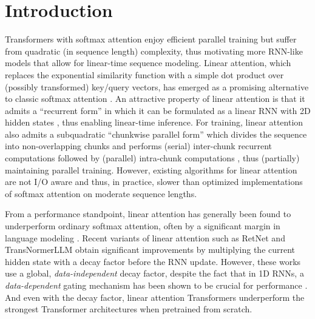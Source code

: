 \vspace{-2mm}
\section{Introduction}
\vspace{-4mm}
\label{sec:intro}
Transformers with softmax attention \citep{vaswani2017attention}  enjoy efficient parallel training but suffer from quadratic (in sequence length) complexity, thus motivating more RNN-like models that allow for linear-time sequence modeling. Linear attention, which replaces the exponential similarity function with a simple dot product over (possibly transformed) key/query vectors, has emerged as a promising alternative to classic softmax attention \citep{katharopoulos2020transformers,performer,kasai-etal-2021-finetuning,peng2021random}. An attractive property of linear attention  is that it admits a  ``recurrent form'' in which it can be formulated as a linear RNN with 2D hidden states \citep{katharopoulos2020transformers}, thus enabling linear-time  inference. For training, linear attention  also admits a subquadratic ``chunkwise parallel form'' which divides the sequence into non-overlapping chunks and performs (serial) inter-chunk recurrent computations followed by (parallel) intra-chunk computations \citep{GAU,sun2023retentive,VQ-Transformer}, thus (partially) maintaining  parallel training. However,  existing algorithms for linear attention are not I/O aware and thus, in practice, slower than  optimized implementations of softmax attention \cite{flashattention1,flashattention2} on moderate sequence lengths.

From a performance standpoint,  linear attention has generally been found to underperform ordinary softmax attention, often by a significant margin in language modeling \cite{kasai-etal-2021-finetuning}. Recent variants of linear attention such as RetNet \citep{sun2023retentive} and TransNormerLLM \citep{qin2023scaling} obtain significant improvements by multiplying the current hidden state with a decay factor before the RNN update. However,  these works use a global, \emph{data-independent} decay factor, despite the fact that in 1D RNNs, a \emph{data-dependent} gating mechanism has been shown to be crucial for performance \citep{unreasonable-forget-gate,HGRN}. And even with the decay factor, linear attention Transformers underperform the strongest Transformer architectures when pretrained from scratch. 

